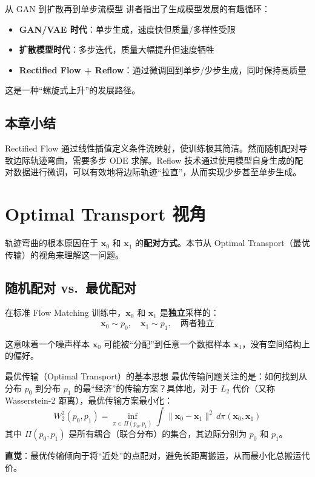 \documentclass[a4paper]{article}
\begin{document}
\begin{knowledgebox}{从 GAN 到扩散再到单步流模型}
讲者指出了生成模型发展的有趣循环：
\begin{itemize}
    \item \textbf{GAN/VAE 时代}：单步生成，速度快但质量/多样性受限
    \item \textbf{扩散模型时代}：多步迭代，质量大幅提升但速度牺牲
    \item \textbf{Rectified Flow + Reflow}：通过微调回到单步/少步生成，同时保持高质量
\end{itemize}
这是一种``螺旋式上升''的发展路径。
\end{knowledgebox}

\subsection{本章小结}

Rectified Flow 通过线性插值定义条件流映射，使训练极其简洁。然而随机配对导致边际轨迹弯曲，需要多步 ODE 求解。Reflow 技术通过使用模型自身生成的配对数据进行微调，可以有效地将边际轨迹``拉直''，从而实现少步甚至单步生成。

\section{Optimal Transport 视角}

轨迹弯曲的根本原因在于 $\mathbf{x}_0$ 和 $\mathbf{x}_1$ 的\textbf{配对方式}。本节从 Optimal Transport（最优传输）的视角来理解这一问题。

\subsection{随机配对 vs.\ 最优配对}

在标准 Flow Matching 训练中，$\mathbf{x}_0$ 和 $\mathbf{x}_1$ 是\textbf{独立}采样的：
$$\mathbf{x}_0 \sim p_0, \quad \mathbf{x}_1 \sim p_1, \quad \text{两者独立}$$

这意味着一个噪声样本 $\mathbf{x}_0$ 可能被``分配''到任意一个数据样本 $\mathbf{x}_1$，没有空间结构上的偏好。

\begin{importantbox}{最优传输（Optimal Transport）的基本思想}
最优传输问题关注的是：如何找到从分布 $p_0$ 到分布 $p_1$ 的最``经济''的传输方案？具体地，对于 $L_2$ 代价（又称 Wasserstein-2 距离），最优传输方案最小化：
$$W_2^2(p_0, p_1) = \inf_{\pi \in \Pi(p_0, p_1)} \int \|\mathbf{x}_0 - \mathbf{x}_1\|^2 \, d\pi(\mathbf{x}_0, \mathbf{x}_1)$$
其中 $\Pi(p_0, p_1)$ 是所有耦合（联合分布）的集合，其边际分别为 $p_0$ 和 $p_1$。

\medskip
\textbf{直觉}：最优传输倾向于将``近处''的点配对，避免长距离搬运，从而最小化总搬运代价。
\end{importantbox}
\end{document}
